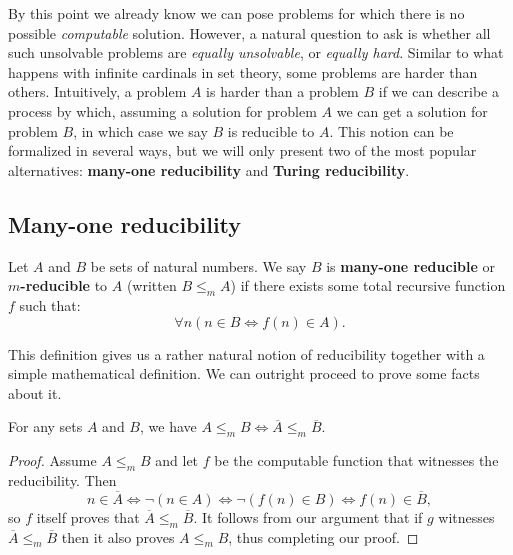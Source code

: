 \documentclass[../main.tex]{memoir}
\begin{document}
By this point we already know we can pose problems for which there is no possible \textit{computable} solution. However, a natural question to ask is whether all such unsolvable problems are \textit{equally unsolvable}, or \textit{equally hard}. Similar to what happens with infinite cardinals in set theory, some problems are harder than others. Intuitively, a problem $A$ is harder than a problem $B$ if we can describe a process by which, assuming a solution for problem $A$ we can get a solution for problem $B$, in which case we say $B$ is reducible to $A$. This notion can be formalized in several ways, but we will only present two of the most popular alternatives: \textbf{many-one reducibility} and \textbf{Turing reducibility}.

\subsection{Many-one reducibility}

\begin{definition}
  \label{def:m-red}
  Let $A$ and $B$ be sets of natural numbers. We say $B$ is \textbf{many-one reducible} or \textbf{$m$-reducible} to $A$ (written $B \le_m A$) if there exists some total recursive function $f$ such that:
  \[ \forall n (n \in B \iff f(n) \in A). \]
\end{definition}

This definition gives us a rather natural notion of reducibility together with a simple mathematical definition. We can outright proceed to prove some facts about it.

\begin{lemma}
  For any sets $A$ and $B$, we have $A \le_m B \iff \overline{A} \le_m \overline{B}$.
\end{lemma}
\begin{proof}
  Assume $A \le_m B$ and let $f$ be the computable function that witnesses the reducibility. Then
  \[ n \in \overline{A} \iff \neg (n \in A) \iff \neg (f(n) \in B) \iff f(n) \in \overline{B}, \]
  so $f$ itself proves that $\overline{A} \le_m \overline{B}$. It follows from our argument that if $g$ witnesses $\overline{A} \le_m \overline{B}$ then it also proves $A \le_m B$, thus completing our proof.
\end{proof}
\end{document}
